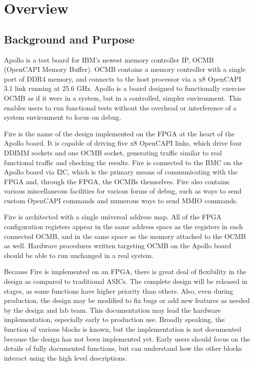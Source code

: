 \graphicspath{ {images/} }

\section{Overview} \label{section_overview}

\subsection{Background and Purpose}
Apollo is a test board for IBM's newest memory controller IP, OCMB
(OpenCAPI Memory Buffer). OCMB contains a memory controller with a
single port of DDR4 memory, and connects to the host processor via a
x8 OpenCAPI 3.1 link running at 25.6 GHz. Apollo is a board designed
to functionally exercise OCMB as if it were in a system, but in a
controlled, simpler environment. This enables users to run functional
tests without the overhead or interference of a system environment to
focus on debug.

Fire is the name of the design implemented on the FPGA at the heart of
the Apollo board. It is capable of driving five x8 OpenCAPI links,
which drive four DDIMM sockets and one OCMB socket, generating traffic
similar to real functional traffic and checking the results. Fire is
connected to the BMC on the Apollo board via I2C, which is the primary
means of communicating with the FPGA and, through the FPGA, the OCMBs
themselves. Fire also contains various miscellaneous facilities for
various forms of debug, such as ways to send custom OpenCAPI commands
and numerous ways to send MMIO commands.

Fire is architected with a single universal address map. All of the
FPGA configuration registers appear in the same address space as the
registers in each connected OCMB, and in the same space as the memory
attached to the OCMB as well. Hardware procedures written targeting
OCMB on the Apollo board should be able to run unchanged in a real
system.

Because Fire is implemented on an FPGA, there is great deal of
flexibility in the design as compared to traditional ASICs. The
complete design will be released in stages, as some functions have
higher priority than others. Also, even during production, the design
may be modified to fix bugs or add new features as needed by the
design and lab team. This documentation may lead the hardware
implementation, especially early to production use. Broadly speaking,
the function of various blocks is known, but the implementation is not
documented because the design has not been implemented yet. Early users
should focus on the details of fully documented functions, but can
understand how the other blocks interact using the high level
descriptions.

